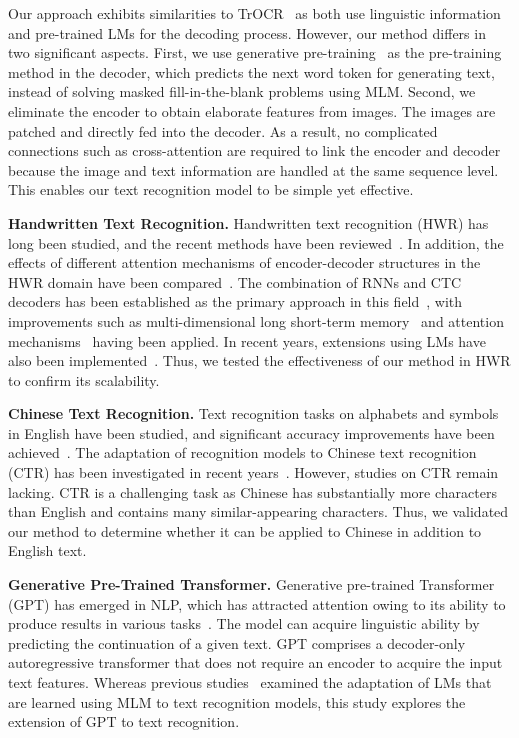 \documentclass[10pt,twocolumn,letterpaper]{article}
\begin{document}
Our approach exhibits similarities to TrOCR~\cite{li2021trocr} as both use linguistic information and pre-trained LMs for the decoding process.
However, our method differs in two significant aspects. 
First, we use generative pre-training~\cite{radford2018gpt} as the pre-training method in the decoder, which predicts the next word token for generating text, instead of solving masked fill-in-the-blank problems using MLM. 
Second, we eliminate the encoder to obtain elaborate features from images.
The images are patched and directly fed into the decoder. 
As a result, no complicated connections such as cross-attention are required to link the encoder and decoder because the image and text information are handled at the same sequence level. 
This enables our text recognition model to be simple yet effective.

\noindent
\textbf{Handwritten Text Recognition.}
Handwritten text recognition (HWR) has long been studied, and the recent methods have been reviewed~\cite{memon2020hwr_review}. 
In addition, the effects of different attention mechanisms of encoder-decoder structures in the HWR domain have been compared~\cite{michael2019evaluating}.
The combination of RNNs and CTC decoders has been established as the primary approach in this field~\cite{bluche2017gated, michael2019evaluating, wang2020decoupled}, with improvements such as multi-dimensional long short-term memory~\cite{puigcerver2017multidimensional} and attention mechanisms~\cite{kang2022pay, diaz2021rethinking} having been applied.
In recent years, extensions using LMs have also been implemented~\cite{li2021trocr}.
Thus, we tested the effectiveness of our method in HWR to confirm its scalability.

\noindent
\textbf{Chinese Text Recognition.}
Text recognition tasks on alphabets and symbols in English have been studied, and significant accuracy improvements have been achieved~\cite{fang2021ABINet, bautista2022parseq}.
The adaptation of recognition models to Chinese text recognition (CTR) has been investigated in recent years~\cite{yu2021btcr, lyu2022maskocr}.
However, studies on CTR remain lacking.
CTR is a challenging task as Chinese has substantially more characters than English and contains many similar-appearing characters.
Thus, we validated our method to determine whether it can be applied to Chinese in addition to English text.


\noindent
\textbf{Generative Pre-Trained Transformer.}
Generative pre-trained Transformer (GPT) has emerged in NLP, which has attracted attention owing to its ability to produce results in various tasks~\cite{radford2018gpt, radford2019language}. 
The model can acquire linguistic ability by predicting the continuation of a given text.
GPT comprises a decoder-only autoregressive transformer that does not require an encoder to acquire the input text features.
Whereas previous studies~\cite{li2021trocr} examined the adaptation of LMs that are learned using MLM to text recognition models, this study explores the extension of GPT to text recognition. 
\end{document}
